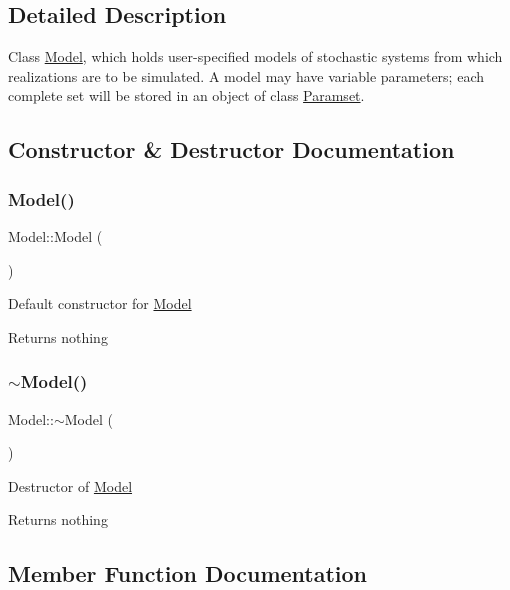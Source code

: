 \subsection{Detailed Description}
Class \hyperlink{class_model}{Model}, which holds user-\/specified models of stochastic systems from which realizations are to be simulated. A model may have variable parameters; each complete set will be stored in an object of class \hyperlink{class_paramset}{Paramset}. 

\subsection{Constructor \& Destructor Documentation}
\mbox{\label{class_model_ae3b375de5f6df4faf74a95d64748e048}} 
\subsubsection{\texorpdfstring{Model()}{Model()}}
{\footnotesize\ttfamily Model\+::\+Model (\begin{DoxyParamCaption}{ }\end{DoxyParamCaption})}

Default constructor for \hyperlink{class_model}{Model}

\begin{DoxyReturn}{Returns}
nothing 
\end{DoxyReturn}
\mbox{\label{class_model_ad6ebd2062a0b823db841a0b88baac4c0}} 
\subsubsection{\texorpdfstring{$\sim$\+Model()}{~Model()}}
{\footnotesize\ttfamily Model\+::$\sim$\+Model (\begin{DoxyParamCaption}{ }\end{DoxyParamCaption})}

Destructor of \hyperlink{class_model}{Model}

\begin{DoxyReturn}{Returns}
nothing 
\end{DoxyReturn}


\subsection{Member Function Documentation}
\mbox{\label{class_model_ab6f784e4ff8cdf3ee5e010ef4dd8d597}} 
